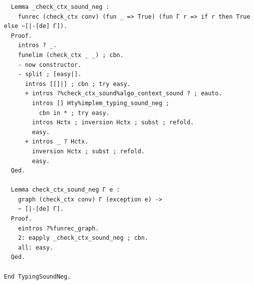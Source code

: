 \documentclass[10pt,a4paper]{amsart}
\begin{document}
\begin{lstlisting}
  Lemma _check_ctx_sound_neg :
    funrec (check_ctx conv) (fun _ => True) (fun Γ r => if r then True else ~[|-[de] Γ]).
  Proof.
    intros ? _.
    funelim (check_ctx _ _) ; cbn.
    - now constructor.
    - split ; [easy|].
      intros [[]|] ; cbn ; try easy.
      + intros ?%check_ctx_sound%algo_context_sound ? ; eauto.
        intros [] Hty%implem_typing_sound_neg ;
          cbn in * ; try easy.
        intros Hctx ; inversion Hctx ; subst ; refold.
        easy.
      + intros _ ? Hctx.
        inversion Hctx ; subst ; refold.
        easy.
  Qed.
     
  Lemma check_ctx_sound_neg Γ e :
    graph (check_ctx conv) Γ (exception e) ->
    ~ [|-[de] Γ].
  Proof.
    eintros ?%funrec_graph.
    2: eapply _check_ctx_sound_neg ; cbn.
    all: easy.
  Qed.

End TypingSoundNeg.
\end{lstlisting}
\end{document}
